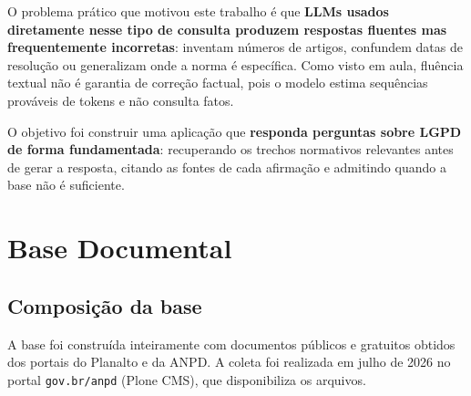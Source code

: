 \documentclass[
  12pt,
  a4paper,
  brazil,
  article,
  oneside,
  sumario=tradicional
]{abntex2}
\begin{document}
O problema prático que motivou este trabalho é que \textbf{LLMs usados diretamente
nesse tipo de consulta produzem respostas fluentes mas frequentemente incorretas}:
inventam números de artigos, confundem datas de resolução ou generalizam onde a norma
é específica. Como visto em aula, fluência textual não é garantia de correção factual,
pois o modelo estima sequências prováveis de tokens e não consulta fatos.

O objetivo foi construir uma aplicação que \textbf{responda perguntas sobre LGPD de
forma fundamentada}: recuperando os trechos normativos relevantes antes de gerar a
resposta, citando as fontes de cada afirmação e admitindo quando a base não é
suficiente.

\section{Base Documental}

\subsection{Composição da base}

A base foi construída inteiramente com documentos públicos e gratuitos obtidos dos
portais do Planalto e da ANPD. A coleta foi realizada em julho de 2026 no portal \texttt{gov.br/anpd} (Plone CMS), que disponibiliza os arquivos.
\end{document}
